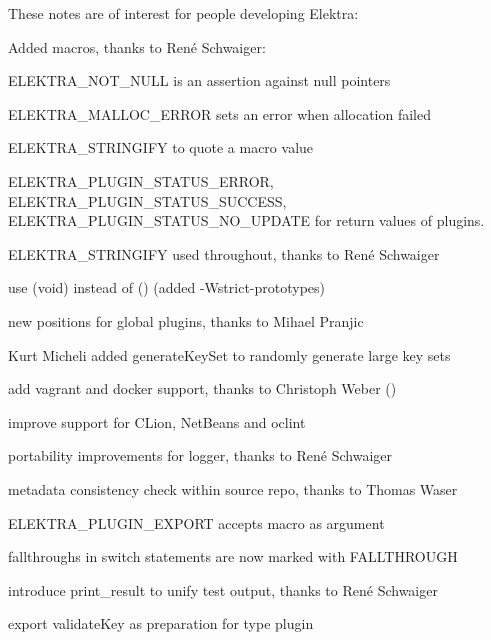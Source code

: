 These notes are of interest for people developing Elektra\+:


\begin{DoxyItemize}
\item Added macros, thanks to René Schwaiger\+:
\begin{DoxyItemize}
\item {\ttfamily E\+L\+E\+K\+T\+R\+A\+\_\+\+N\+O\+T\+\_\+\+N\+U\+LL} is an assertion against null pointers
\item {\ttfamily E\+L\+E\+K\+T\+R\+A\+\_\+\+M\+A\+L\+L\+O\+C\+\_\+\+E\+R\+R\+OR} sets an error when allocation failed
\item {\ttfamily E\+L\+E\+K\+T\+R\+A\+\_\+\+S\+T\+R\+I\+N\+G\+I\+FY} to quote a macro value
\item {\ttfamily E\+L\+E\+K\+T\+R\+A\+\_\+\+P\+L\+U\+G\+I\+N\+\_\+\+S\+T\+A\+T\+U\+S\+\_\+\+E\+R\+R\+OR}, {\ttfamily E\+L\+E\+K\+T\+R\+A\+\_\+\+P\+L\+U\+G\+I\+N\+\_\+\+S\+T\+A\+T\+U\+S\+\_\+\+S\+U\+C\+C\+E\+SS}, {\ttfamily E\+L\+E\+K\+T\+R\+A\+\_\+\+P\+L\+U\+G\+I\+N\+\_\+\+S\+T\+A\+T\+U\+S\+\_\+\+N\+O\+\_\+\+U\+P\+D\+A\+TE} for return values of plugins.
\end{DoxyItemize}
\item {\ttfamily E\+L\+E\+K\+T\+R\+A\+\_\+\+S\+T\+R\+I\+N\+G\+I\+FY} used throughout, thanks to René Schwaiger
\item use {\ttfamily (void)} instead of {\ttfamily ()} (added {\ttfamily -\/\+Wstrict-\/prototypes})
\item new positions for global plugins, thanks to Mihael Pranjic
\item Kurt Micheli added {\ttfamily generate\+Key\+Set} to randomly generate large key sets
\item add vagrant and docker support, thanks to Christoph Weber ()
\item improve support for C\+Lion, Net\+Beans and {\ttfamily oclint}
\item portability improvements for logger, thanks to René Schwaiger
\item metadata consistency check within source repo, thanks to Thomas Waser
\item {\ttfamily E\+L\+E\+K\+T\+R\+A\+\_\+\+P\+L\+U\+G\+I\+N\+\_\+\+E\+X\+P\+O\+RT} accepts macro as argument
\item fallthroughs in switch statements are now marked with {\ttfamily F\+A\+L\+L\+T\+H\+R\+O\+U\+GH}
\item introduce {\ttfamily print\+\_\+result} to unify test output, thanks to René Schwaiger
\item export {\ttfamily validate\+Key} as preparation for type plugin
\end{DoxyItemize}

